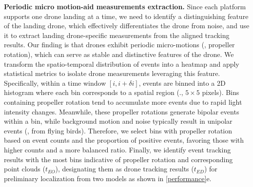 \textbf{Periodic micro motion-aid measurements extraction.} 
Since each platform supports one drone landing at a time, we need to identify a distinguishing feature of the landing drone, which effectively differentiates the drone from noise, and use it to extract landing drone-specific measurements from the aligned tracking results. 
Our finding is that drones exhibit periodic micro-motions (\eg, propeller rotation), which can serve as stable and distinctive features of the drone. 
We transform the spatio-temporal distribution of events into a heatmap and apply statistical metrics to isolate drone measurements leveraging this feature. 
Specifically, within a time window $[i, i + \delta i]$, events are binned into a 2D histogram where each bin corresponds to a spatial region (\eg., $5\times 5$ pixels). 
Bins containing propeller rotation tend to accumulate more events due to rapid light intensity changes. 
Meanwhile, these propeller rotations generate bipolar events within a bin, while background motion and noise typically result in unipolar events (\eg, from flying birds).
Therefore, we select bins with propeller rotation based on event counts and the proportion of positive events, favoring those with higher counts and a more balanced ratio. 
Finally, we identify event tracking results with the most bins indicative of propeller rotation and corresponding point clouds ($t_{EO}$), designating them as drone tracking results ($t_{ED}$) for preliminary localization from two models as shown in \fig \ref{performance}e.
